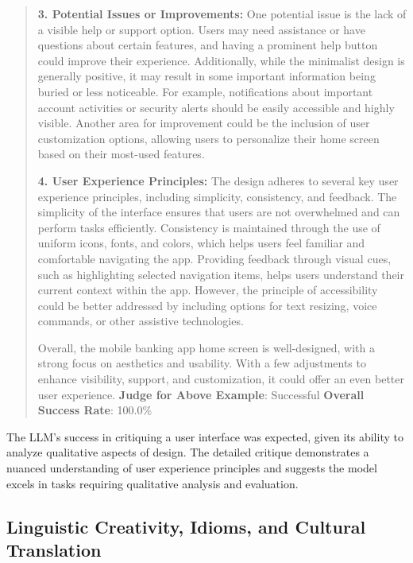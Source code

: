 \documentclass[fleqn,10pt]{wlscirep}
\begin{document}
\begin{quote}
\textbf{3. Potential Issues or Improvements:} One potential issue is the
lack of a visible help or support option. Users may need assistance or
have questions about certain features, and having a prominent help
button could improve their experience. Additionally, while the
minimalist design is generally positive, it may result in some important
information being buried or less noticeable. For example, notifications
about important account activities or security alerts should be easily
accessible and highly visible. Another area for improvement could be the
inclusion of user customization options, allowing users to personalize
their home screen based on their most-used features.

\textbf{4. User Experience Principles:} The design adheres to several
key user experience principles, including simplicity, consistency, and
feedback. The simplicity of the interface ensures that users are not
overwhelmed and can perform tasks efficiently. Consistency is maintained
through the use of uniform icons, fonts, and colors, which helps users
feel familiar and comfortable navigating the app. Providing feedback
through visual cues, such as highlighting selected navigation items,
helps users understand their current context within the app. However,
the principle of accessibility could be better addressed by including
options for text resizing, voice commands, or other assistive
technologies.

Overall, the mobile banking app home screen is well-designed, with a
strong focus on aesthetics and usability. With a few adjustments to
enhance visibility, support, and customization, it could offer an even
better user experience. \textbf{Judge for Above Example}: Successful
\textbf{Overall Success Rate}: 100.0\%
\end{quote}

The LLM's success in critiquing a user interface was expected, given its
ability to analyze qualitative aspects of design. The detailed critique
demonstrates a nuanced understanding of user experience principles and
suggests the model excels in tasks requiring qualitative analysis and
evaluation.

\hypertarget{linguistic-creativity-idioms-and-cultural-translation}{%
\subsection{Linguistic Creativity, Idioms, and Cultural
Translation}\label{linguistic-creativity-idioms-and-cultural-translation}}
\end{document}
